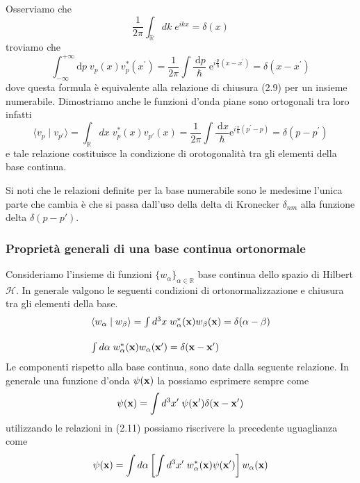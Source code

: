 \noindent Osserviamo che 
\begin{equation*}
	\frac{1}{2\pi} \int_{\mathbb{R}} dk \; e^{ikx} = \delta(x)
\end{equation*}
troviamo che 
\begin{equation}
\int_{-\infty}^{+\infty} \mathrm{d} p\;  v_p(x) v_p^*\left(x^{\prime}\right)=\frac{1}{2 \pi} \int \frac{\mathrm{~d} p}{\hbar} \; \mathrm{e}^{i \frac{p}{\hbar}\left(x-x^{\prime}\right)}=\delta\left(x-x^{\prime}\right)
\end{equation}
dove questa formula \`e equivalente alla relazione di chiusura (2.9) per un insieme numerabile. Dimostriamo anche le funzioni d'onda piane sono ortogonali tra loro infatti 
\begin{equation*}
	\langle v_p\;|\;v_{p'} \rangle = \int_{\mathbb{R}} dx \; v_p^*(x)v_{p'}(x) = \frac{1}{2 \pi} \int \frac{\mathrm{~d} x}{\hbar} \mathrm{e}^{i \frac{x}{\hbar}\left(p^{\prime}-p\right)}=\delta\left(p-p^{\prime}\right)
\end{equation*}
e tale relazione costituisce la condizione di orotogonalit\`a tra gli elementi della base continua.
\newline 

\noindent Si noti che le relazioni definite per la base numerabile sono le medesime l'unica parte che cambia \`e che si passa dall'uso della delta di Kronecker $\delta_{nm}$ alla funzione delta $\delta(p-p')$.

\subsubsection{Propriet\`a generali di una base continua ortonormale}
Consideriamo l'insieme di funzioni $\{w_\alpha\}_{\alpha \in \mathbb{R}}$ base continua dello spazio di Hilbert 
$\mathcal{H}$. In generale valgono le seguenti condizioni di ortonormalizzazione e chiusura tra gli elementi della base.
\begin{equation}
\begin{array}{l}	
\langle w_\alpha \;|\; w_\beta \rangle = \int d^3x \; w_\alpha^*(\bold{x})w_\beta(\bold{x}) = \delta(\alpha - \beta) \\[0.5cm]
\int d \alpha \; w_\alpha^*(\bold{x})w_{\alpha}(\bold{x}') = \delta(\bold{x}-\bold{x}')
\end{array}
\end{equation}
Le componenti rispetto alla base continua, sono date dalla seguente relazione. In generale una funzione d'onda $\psi(\bold{x})$ la possiamo esprimere sempre come
\begin{equation*}
	\psi(\bold{x}) = \int d^3x' \; \psi(\bold{x}') \delta(\bold{x} - \bold{x}')
\end{equation*}
utilizzando le relazioni in (2.11) possiamo riscrivere  la precedente uguaglianza come
\begin{equation*}
	\psi(\bold{x}) = \int d\alpha \left [ \int d^3x' \; w_\alpha^*(\bold{x})\psi(\bold{x}') \right ] w_\alpha(\bold{x})
\end{equation*}
\newpage

